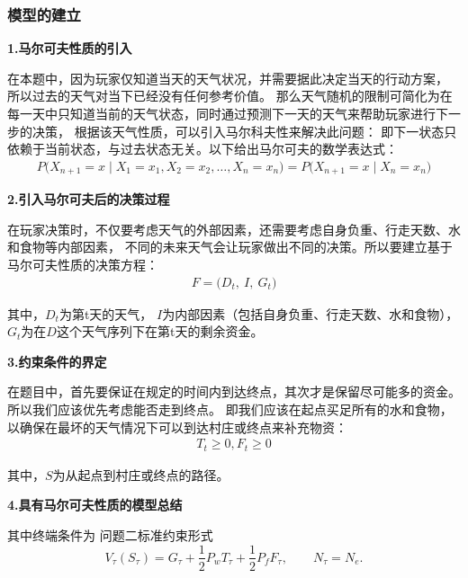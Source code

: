 \subsubsection{模型的建立}
\textbf{1.马尔可夫性质的引入} 

在本题中，因为玩家仅知道当天的天气状况，并需要据此决定当天的行动方案，
%
所以过去的天气对当下已经没有任何参考价值。
%
那么天气随机的限制可简化为在每一天中只知道当前的天气状态，同时通过预测下一天的天气来帮助玩家进行下一步的决策，
%
根据该天气性质，可以引入马尔科夫性来解决此问题：
%
即下一状态只依赖于当前状态，与过去状态无关。以下给出马尔可夫的数学表达式：
\begin{align}
P\bigl(X_{n+1}=x \mid X_1=x_1, X_2=x_2, \dots, X_n=x_n\bigr) = P\bigl(X_{n+1}=x \mid X_n=x_n\bigr)
\end{align}

\textbf{2.引入马尔可夫后的决策过程} 

在玩家决策时，不仅要考虑天气的外部因素，还需要考虑自身负重、行走天数、水和食物等内部因素，
%
不同的未来天气会让玩家做出不同的决策。所以要建立基于马尔可夫性质的决策方程：
\begin{align}
F = \bigl(D_t,~I, ~G_t\bigr)
\end{align}

其中，$D_t$为第t天的天气， $I$为内部因素（包括自身负重、行走天数、水和食物），
%
$G_t$为在$D$这个天气序列下在第t天的剩余资金。

\textbf{3.约束条件的界定} 

在题目中，首先要保证在规定的时间内到达终点，其次才是保留尽可能多的资金。
%
所以我们应该优先考虑能否走到终点。
%
即我们应该在起点买足所有的水和食物，以确保在最坏的天气情况下可以到达村庄或终点来补充物资：
\begin{align}
T_t \geqslant 0, F_t \geqslant 0
\end{align}

其中，$S$为从起点到村庄或终点的路径。

\textbf{4.具有马尔可夫性质的模型总结} 

其中终端条件为
问题二标准约束形式
\begin{equation}
V_{\tau}(S_{\tau})
=
G_{\tau}+\frac{1}{2}P_wT_{\tau}+\frac{1}{2}P_fF_{\tau},
\qquad N_{\tau}=N_e.
\label{eq:q2_terminal}
\end{equation}

